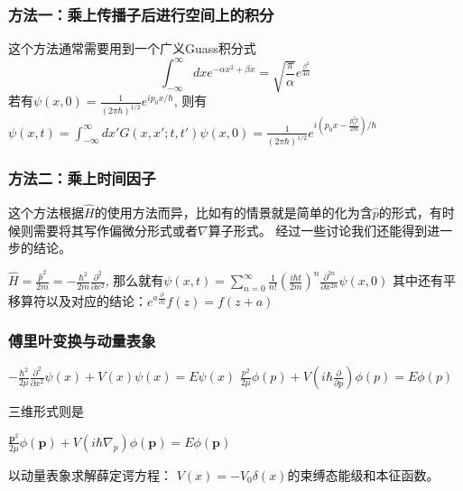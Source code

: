 \documentclass[UTF8,a4paper,10pt]{ctexart}
\begin{document}
\subsubsection{方法一：乘上传播子后进行空间上的积分}
这个方法通常需要用到一个广义Guass积分式
\begin{equation}
    \int_{-\infty}^{\infty}dxe^{-\alpha x^2+\beta x}=\sqrt{\frac{\pi}{\alpha}}e^{\frac{\beta^2}{4\alpha}}
\end{equation}
若有$\psi(x,0)=\frac{1}{(2\pi\hbar)^{1/2}}e^{ip_{0}x/\hbar}$,
则有$\psi(x,t)=\int_{-\infty}^{\infty}dx'G(x,x';t,t')\psi(x,0)=\frac{1}{(2\pi\hbar)^{1/2}}e^{i(p_{0}x-\frac{p_{0}^2t}{2m})/\hbar}$
\subsubsection{方法二：乘上时间因子}
这个方法根据$\hat{H}$的使用方法而异，比如有的情景就是简单的化为含$\hat{p}$的形式，有时候则需要将其写作偏微分形式或者$\nabla$算子形式。
经过一些讨论我们还能得到进一步的结论。\newline

$\hat{H}=\frac{\hat{p}^2}{2m}=-\frac{\hbar^2}{2m}\frac{\partial^2}{\partial x^2}$,
那么就有$\psi(x,t)=\sum_{n=0}^{\infty}\frac{1}{n!}(\frac{i\hbar t}{2m})^n\frac{\partial^{2n}}{\partial x^{2n}}\psi(x,0)$
其中还有平移算符以及对应的结论：$e^{a\frac{\partial}{\partial z}}f(z)=f(z+a)$\newline

\subsubsection{傅里叶变换与动量表象}
$-\frac{\hbar^2}{2\mu}\frac{\partial^2}{\partial x^2}\psi(x)+V(x)\psi(x)=E\psi(x)$
$\frac{p^2}{2\mu}\phi(p)+V(i\hbar\frac{\partial}{\partial p})\phi(p)=E\phi(p)$\newline

三维形式则是 \newline

$\frac{\boldsymbol{p}^2}{2\mu}\phi(\boldsymbol{p})+V(i\hbar\nabla_{p})\phi(\boldsymbol{p})=E\phi(\boldsymbol{p})$\newline

以动量表象求解薛定谔方程：
$V(x)=-V_{0}\delta(x)$的束缚态能级和本征函数。\newline
\end{document}
